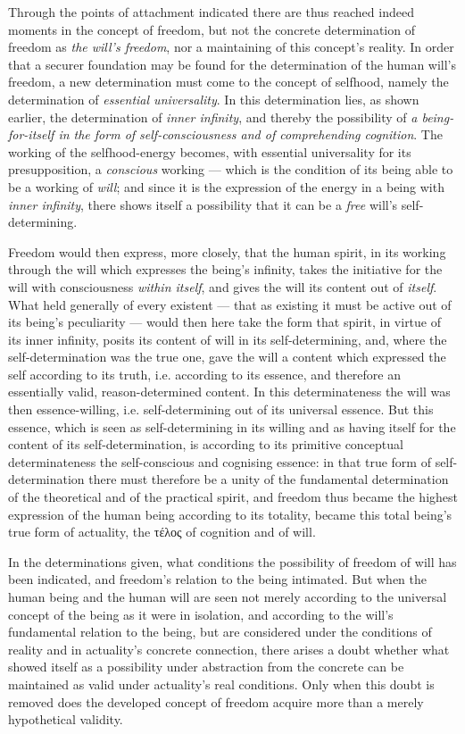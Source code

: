 \documentclass[12pt,a4paper]{book}
\begin{document}
Through the points of attachment indicated there are thus reached indeed
moments in the concept of freedom, but not the concrete determination of
freedom as \emph{the will's freedom}, nor a maintaining of this concept's
reality. In order that a securer foundation may be found for the determination
of the human will's freedom, a new determination must come to the concept of
selfhood, namely the determination of \emph{essential universality}. In this
determination lies, as shown earlier, the determination of \emph{inner
infinity}, and thereby the possibility of \emph{a being-for-itself in the form
of self-consciousness and of comprehending cognition}. The working of the
selfhood-energy becomes, with essential universality for its presupposition, a
\emph{conscious} working --- which is the condition of its being able to be a
working of \emph{will}; and since it is the expression of the energy in a being
with \emph{inner infinity},
there shows itself a possibility that it can be a \emph{free} will's
self-determining.

Freedom would then express, more closely, that the human spirit, in its working
through the will which expresses the being's infinity, takes the initiative for
the will with consciousness \emph{within itself}, and gives the will its
content out of \emph{itself}. What held generally of every existent --- that as
existing it must be active out of its being's peculiarity --- would then here
take the form that spirit, in virtue of its inner infinity, posits its content
of will in its self-determining, and, where the self-determination was the true
one, gave the will a content which expressed the self according to its truth,
i.e. according to its essence, and therefore an essentially valid,
reason-determined content. In this determinateness the will was then
essence-willing, i.e. self-determining out of its universal essence. But this
essence, which is seen as self-determining in its willing and as having itself
for the content of its self-determination, is according to its primitive
conceptual determinateness the self-conscious and cognising essence: in that
true form of self-determination there must therefore be a unity of the
fundamental determination of the theoretical and of the practical spirit, and
freedom thus became the highest expression of the human being according to its
totality, became this total being's true form of actuality, the τέλος of
cognition and of will.

In the determinations given, what conditions the possibility of freedom of will
has been indicated, and freedom's relation to the being intimated. But when the
human being and the human will are seen not merely according to the universal
concept of the being as it were in isolation, and according to the will's
fundamental relation to the being, but are considered under the conditions of
reality and in actuality's concrete connection, there arises a doubt whether
what showed itself as a possibility under abstraction from the concrete can be
maintained as valid under actuality's real conditions. Only when this doubt is
removed does the developed concept of freedom acquire more than a merely
hypothetical validity.
\end{document}
